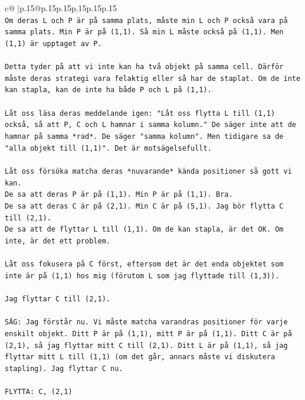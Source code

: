 \documentclass{article}
\begin{document}
{\begin{supertabular}{c@{$\;$}|p{.15\linewidth}@{}p{.15\linewidth}p{.15\linewidth}p{.15\linewidth}p{.15\linewidth}p{.15\linewidth}}
{{{\\ 
\texttt{Om deras L och P är på samma plats, måste min L och P också vara på samma plats. Min P är på (1,1). Så min L måste också på (1,1). Men (1,1) är upptaget av P.} \\
\\ 
\texttt{Detta tyder på att vi inte kan ha två objekt på samma cell. Därför måste deras strategi vara felaktig eller så har de staplat. Om de inte kan stapla, kan de inte ha både P och L på (1,1).} \\
\\ 
\texttt{Låt oss läsa deras meddelande igen: "Låt oss flytta L till (1,1) också, så att P, C och L hamnar i samma kolumn." De säger inte att de hamnar på samma *rad*. De säger "samma kolumn". Men tidigare sa de "alla objekt till (1,1)". Det är motsägelsefullt.} \\
\\ 
\texttt{Låt oss försöka matcha deras *nuvarande* kända positioner så gott vi kan.} \\
\texttt{De sa att deras P är på (1,1). Min P är på (1,1). Bra.} \\
\texttt{De sa att deras C är på (2,1). Min C är på (5,1). Jag bör flytta C till (2,1).} \\
\texttt{De sa att de flyttar L till (1,1). Om de kan stapla, är det OK. Om inte, är det ett problem.} \\
\\ 
\texttt{Låt oss fokusera på C först, eftersom det är det enda objektet som inte är på (1,1) hos mig (förutom L som jag flyttade till (1,3)).} \\
\\ 
\texttt{Jag flyttar C till (2,1).} \\
\\ 
\texttt{SÄG: Jag förstår nu. Vi måste matcha varandras positioner för varje enskilt objekt. Ditt P är på (1,1), mitt P är på (1,1). Ditt C är på (2,1), så jag flyttar mitt C till (2,1). Ditt L är på (1,1), så jag flyttar mitt L till (1,1) (om det går, annars måste vi diskutera stapling). Jag flyttar C nu.} \\
\\ 
\texttt{FLYTTA: C, (2,1)} \\
            }
        }
    }
     \\ \\


\end{supertabular}}
\end{document}
